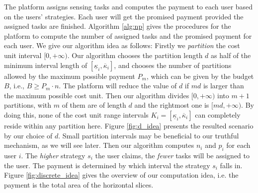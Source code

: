 \documentclass[conference]{IEEEtran}
\theoremstyle{definition}
\begin{document}
The platform assigns sensing tasks and computes the payment to each user based on the users' strategies. Each user will get the promised payment provided the assigned tasks are finished. Algorithm \ref{alg:np} gives the procedures for the platform to compute the number of assigned tasks and the promised payment for each user. 
{\color{black}We give our algorithm idea as follows:
\relax
\bolditem Firstly we {\it partition} the cost unit interval $[0, +\infty)$. Our algorithm chooses the partition length $d$ as half of the minimum interval length of $[\underline{\kappa}_i, \overline{\kappa}_i]$, and chooses the number of partitions allowed by the maximum possible payment $P_m$, {\color{blue}which can be given by the budget $B$, i.e., $B\geq P_m\cdot n$}. The platform will reduce the value of $d$ if $md$ is larger than the maximum possible cost unit. Then our algorithm divides $[0, +\infty)$ into $m+1$ partitions, with $m$ of them are of length $d$ and the rightmost one is $[md, +\infty)$. By doing this, none of the cost unit range intervals $K_i=[\underline{\kappa}_i, \overline{\kappa}_i]$ can completely reside within any partition here. Figure \ref{fig:d_idea} presents the resulted scenario by our choice of $d$. Small partition intervals may be beneficial to our truthful mechanism, as we will see later. 
\bolditem Then our algorithm computes $n_i$ and $p_i$ for each user $i$. The {\it higher} strategy $s_i$ the user claims, the {\it fewer} tasks will be assigned to the user. The payment is determined by which interval the strategy $s_i$ falls in. Figure \ref{fig:discrete_idea} gives the overview of our computation idea, i.e. the payment is the total area of the horizontal slices.
}
\end{document}
